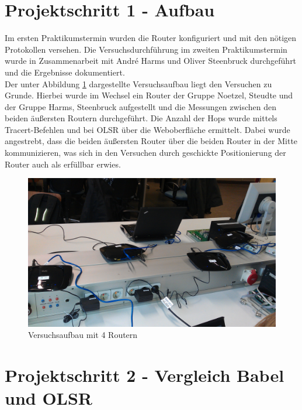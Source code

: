 \documentclass[10pt]{scrartcl}
\author{Carsten Noetzel, Armin Steudte}
\title{\titletext}
\date{09.11.2011}
\begin{document}
\maketitle

\setcounter{tocdepth}{3}
\tableofcontents
\listoffigures

\section{Projektschritt 1 - Aufbau}
Im ersten Praktikumstermin wurden die Router konfiguriert und mit den nötigen Protokollen versehen. Die Versuchsdurchführung im zweiten Praktikumstermin wurde in Zusammenarbeit mit André Harms und Oliver Steenbruck durchgeführt und die Ergebnisse dokumentiert.\\
Der unter Abbildung \ref{fig:Aufbau} dargestellte Versuchsaufbau liegt den Versuchen zu Grunde. Hierbei wurde im Wechsel ein Router der Gruppe Noetzel, Steudte und der Gruppe Harms, Steenbruck aufgestellt und die Messungen zwischen den beiden äußersten Routern durchgeführt. Die Anzahl der Hops wurde mittels Tracert-Befehlen und bei OLSR über die Weboberfläche ermittelt. Dabei wurde angestrebt, dass die beiden äußersten Router über die beiden Router in  der Mitte kommunizieren, was sich in den Versuchen durch geschickte Positionierung der Router auch als erfüllbar erwies.

\begin{figure}[htbp]
	\centering	\includegraphics[width=1.0\textwidth]{../AufbauBild.jpg}
	\caption{Versuchsaufbau mit 4 Routern}
	\label{fig:Aufbau}
\end{figure} 

\section{Projektschritt 2 - Vergleich Babel und OLSR}
\end{document}
